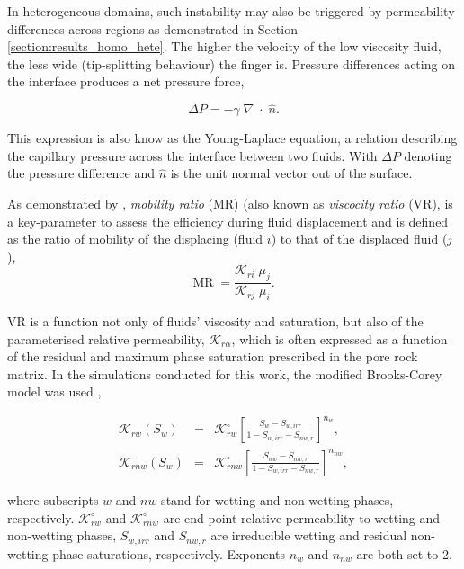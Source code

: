 \documentclass[preprint,authoryear,12pt]{elsarticle}
\newcommand{\frc}{\displaystyle\frac}
\begin{document}
\medskip 
In heterogeneous domains, such instability may also be triggered by permeability differences across regions as demonstrated in Section \ref{section:results_homo_hete}. The higher the velocity of the low viscosity fluid, the less wide (tip-splitting behaviour) the finger is. Pressure differences acting on the interface produces a net pressure force,      

\begin{equation} 
\Delta P= - \gamma \; \nabla \; \cdot \; \hat{n}. 
\label{eq:pressure_dif} 
\end{equation}

\noindent This expression is also know as the Young-Laplace equation, a relation describing the capillary pressure across the interface between two fluids. With $\Delta P$ denoting the pressure difference and $\hat{n}$ is the unit normal vector out of the surface. 

\medskip
As demonstrated by \citet{habermann_1960}, \textit{mobility ratio} (MR) (also known as \textit{viscocity ratio} (VR), is a key-parameter to assess the efficiency during fluid displacement and is defined as the ratio of mobility of the displacing (fluid $i$) to that of the displaced fluid ($j$),
\begin{equation}
 \text{MR} \; = \frac{\mathcal{K}_{ri} \; \mu_{j}}{\mathcal{K}_{rj} \; \mu_{i}}. 
\label{eq:MR}
\end{equation}

\noindent VR  is a function not only of fluids' viscosity and saturation, but also of the parameterised relative permeability, $\mathcal{K}_{r\alpha}$, which is often expressed as a function of the residual and maximum phase saturation prescribed in the pore rock matrix. In the simulations conducted for this work, the modified Brooks-Corey model was used \citep{alpak_1999,brooks_1964},

\begin{eqnarray}
  \mathcal{K}_{rw}\left(S_{w}\right) &=& \mathcal{K}^{\circ}_{rw}\left[\frc{S_{w}-S_{w,irr}}{1-S_{w,irr}-S_{nw,r}}\right]^{n_{w}}, \label{Eqn:CoreyBrooks1}\\
  \mathcal{K}_{rnw}\left(S_{w}\right) &=& \mathcal{K}^{\circ}_{rnw}\left[\frc{S_{nw}-S_{nw,r}}{1-S_{w,irr}-S_{nw,r}}\right]^{n_{nw}}, \label{Eqn:CoreyBrooks2}
\end{eqnarray}

\noindent where subscripts $w$ and $nw$ stand for wetting and non-wetting phases, respectively. $\mathcal{K}^{\circ}_{rw}$ and $\mathcal{K}^{\circ}_{rnw}$ are end-point relative permeability to wetting and non-wetting phases, $S_{w,irr}$ and $S_{nw,r}$ are irreducible wetting and residual non-wetting phase saturations, respectively. Exponents $n_{w}$ and $n_{nw}$ are both set to 2.
\end{document}

